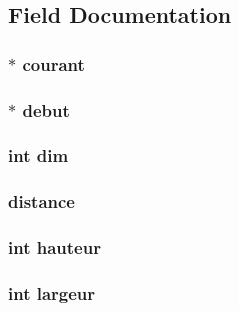 \subsection{Field Documentation}
\hypertarget{structimage_af818438fb3c67dd196511ae5acabc100}{
\subsubsection[{courant}]{$\ast$ courant}}\label{structimage_af818438fb3c67dd196511ae5acabc100}
\hypertarget{structimage_a110ddf3326fbde4ebd40ba29fd7a1fbc}{
\subsubsection[{debut}]{$\ast$ debut}}\label{structimage_a110ddf3326fbde4ebd40ba29fd7a1fbc}
\hypertarget{structimage_a70b5e28b5bc3d1b63a7435c5fe50b837}{
\subsubsection[{dim}]{\setlength{\rightskip}{0pt plus 5cm}int dim}}\label{structimage_a70b5e28b5bc3d1b63a7435c5fe50b837}
\hypertarget{structimage_ae7c15b602811667eb91edaf897fbae40}{
\subsubsection[{distance}]{ distance}}\label{structimage_ae7c15b602811667eb91edaf897fbae40}
\hypertarget{structimage_a5e94a2f98c16e8b6860f95c99da1c0d3}{
\subsubsection[{hauteur}]{\setlength{\rightskip}{0pt plus 5cm}int hauteur}}\label{structimage_a5e94a2f98c16e8b6860f95c99da1c0d3}
\hypertarget{structimage_a74f0f2591e5f65bf792b2c3c67817d78}{
\subsubsection[{largeur}]{\setlength{\rightskip}{0pt plus 5cm}int largeur}}\label{structimage_a74f0f2591e5f65bf792b2c3c67817d78}
